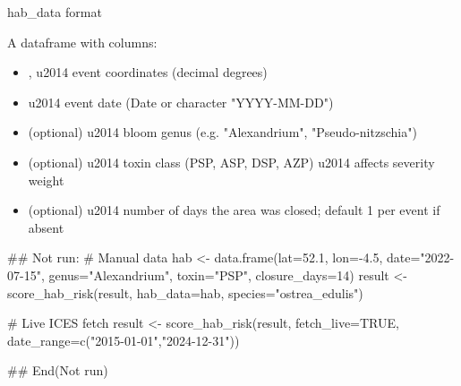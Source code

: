 \documentclass[a4paper]{book}
\begin{document}
%
\begin{Section}{hab\_data format}

A dataframe with columns:
\begin{itemize}

\item{} ,  \bsl{}u2014 event coordinates (decimal degrees)
\item{}  \bsl{}u2014 event date (Date or character "YYYY-MM-DD")
\item{}  (optional) \bsl{}u2014 bloom genus (e.g. "Alexandrium", "Pseudo-nitzschia")
\item{}  (optional) \bsl{}u2014 toxin class (PSP, ASP, DSP, AZP) \bsl{}u2014 affects severity weight
\item{}  (optional) \bsl{}u2014 number of days the area was closed; default 1
per event if absent

\end{itemize}

\end{Section}
%
\begin{Examples}
\begin{ExampleCode}
## Not run: 
# Manual data
hab <- data.frame(lat=52.1, lon=-4.5, date="2022-07-15",
                  genus="Alexandrium", toxin="PSP", closure_days=14)
result <- score_hab_risk(result, hab_data=hab, species="ostrea_edulis")

# Live ICES fetch
result <- score_hab_risk(result, fetch_live=TRUE,
                         date_range=c("2015-01-01","2024-12-31"))

## End(Not run)
\end{ExampleCode}
\end{Examples}
%
\end{document}
